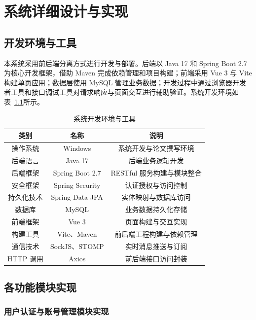 \chapter{系统详细设计与实现}

\section{开发环境与工具}

本系统采用前后端分离方式进行开发与部署。后端以 Java 17 和 Spring Boot 2.7 为核心开发框架，借助 Maven 完成依赖管理和项目构建；前端采用 Vue 3 与 Vite 构建单页应用；数据层使用 MySQL 管理业务数据；开发过程中通过浏览器开发者工具和接口调试工具对请求响应与页面交互进行辅助验证。系统开发环境如表~\ref{tab:dev-env}所示。

\begin{table}[htbp]
\centering
\footnotesize
\caption{系统开发环境与工具}
\label{tab:dev-env}
\begin{tabular}{|c|c|c|}
\hline
类别 & 名称 & 说明 \\\hline
操作系统 & Windows & 系统开发与论文撰写环境 \\\hline
后端语言 & Java 17 & 后端业务逻辑开发 \\\hline
后端框架 & Spring Boot 2.7 & RESTful 服务构建与模块整合 \\\hline
安全框架 & Spring Security & 认证授权与访问控制 \\\hline
持久化技术 & Spring Data JPA & 实体映射与数据库访问 \\\hline
数据库 & MySQL & 业务数据持久化存储 \\\hline
前端框架 & Vue 3 & 页面构建与交互实现 \\\hline
构建工具 & Vite、Maven & 前后端工程构建与依赖管理 \\\hline
通信技术 & SockJS、STOMP & 实时消息推送与订阅 \\\hline
HTTP 调用 & Axios & 前后端接口访问封装 \\\hline
\end{tabular}
\end{table}

\section{各功能模块实现}

\subsection{用户认证与账号管理模块实现}

